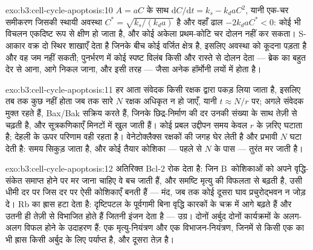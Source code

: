 \begin{solution}{exo:b3:cell-cycle-apoptosis:10}
$A = aC$ के साथ $\mathrm{d}C/\mathrm{d}t = k_{s} - k_{d}aC^{2}$, यानी
एक-चर समीकरण जिसकी स्थायी अवस्था $C^{*} = \sqrt{k_{s}/(k_{d}a)}$ है
और वहाँ ढाल $-2k_{d}aC^{*} < 0$: कोई भी विचलन एकदिष्ट रूप से क्षीण हो
जाता है, और कोई अकेला प्रथम-कोटि चर दोलन नहीं कर सकता।
S-आकार वक्र दो स्थिर शाखाएँ देता है जिनके बीच कोई वर्जित क्षेत्र है,
इसलिए अवस्था को कूदना पड़ता है और वह जम नहीं सकती; पुनर्भरण में कोई
स्पष्ट विलंब किसी और रास्ते से दोलन देता --- ब्रेक का बहुत देर से आना,
आगे निकल जाना, और इसी तरह --- जैसा अनेक हॉर्मोनी लयों में होता है।
\end{solution}

\begin{solution}{exo:b3:cell-cycle-apoptosis:11}
हर आता संवेदक किसी रक्षक द्वारा पकड़ लिया जाता है, इसलिए तब तक कुछ नहीं
होता जब तक सारे $N$ रक्षक अधिकृत न हो जाएँ, यानी $t \approx N/r$ पर;
अगले संवेदक मुक्त रहते हैं, Bax/Bak सक्रिय करते हैं, जिनके छिद्र-निर्माण
की दर उनकी संख्या के साथ तेज़ी से चढ़ती है, और सूत्रकणिकाएँ मिनटों में
खुल जाती हैं। कोई प्रबल उद्दीपन समय केवल $r$ के ज़रिए घटाता है; देहली
के ऊपर परिणाम वही रहता है। वेनेटोक्लैक्स रक्षकों की जगह घेर लेती है और
प्रभावी $N$ घटा देती है: समय सिकुड़ जाता है, और कोई तैयार कोशिका ---
पहले से $N$ के पास --- तुरंत मर जाती है।
\end{solution}

\begin{solution}{exo:b3:cell-cycle-apoptosis:12}
अतिरिक्त Bcl-2  रोक देता है: जिन B~कोशिकाओं को अपने
वृद्धि-संकेत समाप्त होने पर मर जाना चाहिए वे बच जाती हैं, और समष्टि
मृत्यु की विफलता से बढ़ती है, उसी धीमी दर पर जिस दर पर ऐसी कोशिकाएँ
बनती हैं --- मंद, जब तक कोई दूसरा घाव प्रचुरोद्भवन न जोड़ दे। Rb का
ह्रास  हटा देता है: दृष्टिपटल के पूर्वगामी बिना वृद्धि
कारकों के चक्र में आगे बढ़ते हैं और उतनी ही तेज़ी से विभाजित होते हैं
जितनी इंजन देता है --- उग्र। दोनों अर्बुद दोनों कार्यक्रमों के
अलग-अलग विफल होने के उदाहरण हैं: एक मृत्यु-नियंत्रण और एक
विभाजन-नियंत्रण, जिनमें से किसी एक का भी ह्रास किसी अर्बुद के लिए
पर्याप्त है, और दूसरा तेज़ है।
\end{solution}

